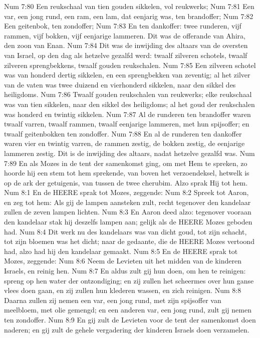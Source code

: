 Num 7:80  Een reukschaal van tien gouden sikkelen, vol reukwerks;
Num 7:81  Een var, een jong rund, een ram, een lam, dat eenjarig was, ten brandoffer;
Num 7:82  Een geitenbok, ten zondoffer;
Num 7:83  En ten dankoffer: twee runderen, vijf rammen, vijf bokken, vijf eenjarige lammeren. Dit was de offerande van Ahira, den zoon van Enan.
Num 7:84  Dit was de inwijding des altaars van de oversten van Israel, op den dag als hetzelve gezalfd werd: twaalf zilveren schotels, twaalf zilveren sprengbekkens, twaalf gouden reukschalen.
Num 7:85  Een zilveren schotel was van honderd dertig sikkelen, en een sprengbekken van zeventig; al het zilver van de vaten was twee duizend en vierhonderd sikkelen, naar den sikkel des heiligdoms.
Num 7:86  Twaalf gouden reukschalen van reukwerks; elke reukschaal was van tien sikkelen, naar den sikkel des heiligdoms; al het goud der reukschalen was honderd en twintig sikkelen.
Num 7:87  Al de runderen ten brandoffer waren twaalf varren, twaalf rammen, twaalf eenjarige lammeren, met hun spijsoffer; en twaalf geitenbokken ten zondoffer.
Num 7:88  En al de runderen ten dankoffer waren vier en twintig varren, de rammen zestig, de bokken zestig, de eenjarige lammeren zestig. Dit is de inwijding des altaars, nadat hetzelve gezalfd was.
Num 7:89  En als Mozes in de tent der samenkomst ging, om met Hem te spreken, zo hoorde hij een stem tot hem sprekende, van boven het verzoendeksel, hetwelk is op de ark der getuigenis, van tussen de twee cherubim. Alzo sprak Hij tot hem.
Num 8:1  En de HEERE sprak tot Mozes, zeggende:
Num 8:2  Spreek tot Aaron, en zeg tot hem: Als gij de lampen aansteken zult, recht tegenover den kandelaar zullen de zeven lampen lichten.
Num 8:3  En Aaron deed alzo: tegenover vooraan den kandelaar stak hij deszelfs lampen aan; gelijk als de HEERE Mozes geboden had.
Num 8:4  Dit werk nu des kandelaars was van dicht goud, tot zijn schacht, tot zijn bloemen was het dicht; naar de gedaante, die de HEERE Mozes vertoond had, alzo had hij den kandelaar gemaakt.
Num 8:5  En de HEERE sprak tot Mozes, zeggende:
Num 8:6  Neem de Levieten uit het midden van de kinderen Israels, en reinig hen.
Num 8:7  En aldus zult gij hun doen, om hen te reinigen: spreng op hen water der ontzondiging; en zij zullen het scheermes over hun ganse vlees doen gaan, en zij zullen hun klederen wassen, en zich reinigen.
Num 8:8  Daarna zullen zij nemen een var, een jong rund, met zijn spijsoffer van meelbloem, met olie gemengd; en een anderen var, een jong rund, zult gij nemen ten zondoffer.
Num 8:9  En gij zult de Levieten voor de tent der samenkomst doen naderen; en gij zult de gehele vergadering der kinderen Israels doen verzamelen.
